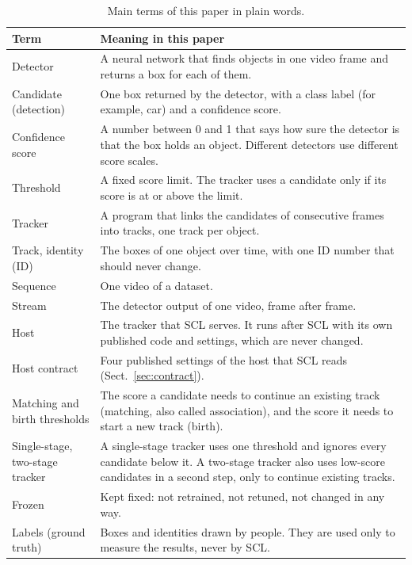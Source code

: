 \documentclass[pdflatex,sn-mathphys-num,iicol]{sn-jnl}
\newcommand{\scl}{SCL}
\begin{document}
\begin{table}[t]
\caption{Main terms of this paper in plain words.}
\label{tab:terms}
\centering\footnotesize
\setlength{\tabcolsep}{4pt}
\renewcommand{\arraystretch}{1.15}
\begin{tabular}{@{}>{\raggedright\arraybackslash}p{32mm}>{\raggedright\arraybackslash}p{123mm}@{}}
\toprule
Term & Meaning in this paper\\
\midrule
Detector & A neural network that finds objects in one video frame and returns a box for each of them.\\
Candidate (detection) & One box returned by the detector, with a class label (for example, car) and a confidence score.\\
Confidence score & A number between 0 and 1 that says how sure the detector is that the box holds an object. Different detectors use different score scales.\\
Threshold & A fixed score limit. The tracker uses a candidate only if its score is at or above the limit.\\
Tracker & A program that links the candidates of consecutive frames into tracks, one track per object.\\
Track, identity (ID) & The boxes of one object over time, with one ID number that should never change.\\
Sequence & One video of a dataset.\\
Stream & The detector output of one video, frame after frame.\\
Host & The tracker that \scl{} serves. It runs after \scl{} with its own published code and settings, which are never changed.\\
Host contract & Four published settings of the host that \scl{} reads (Sect.~\ref{sec:contract}).\\
Matching and birth thresholds & The score a candidate needs to continue an existing track (matching, also called association), and the score it needs to start a new track (birth).\\
Single-stage, two-stage tracker & A single-stage tracker uses one threshold and ignores every candidate below it. A two-stage tracker also uses low-score candidates in a second step, only to continue existing tracks.\\
Frozen & Kept fixed: not retrained, not retuned, not changed in any way.\\
Labels (ground truth) & Boxes and identities drawn by people. They are used only to measure the results, never by \scl{}.\\

\end{tabular}
\end{table}
\end{document}
